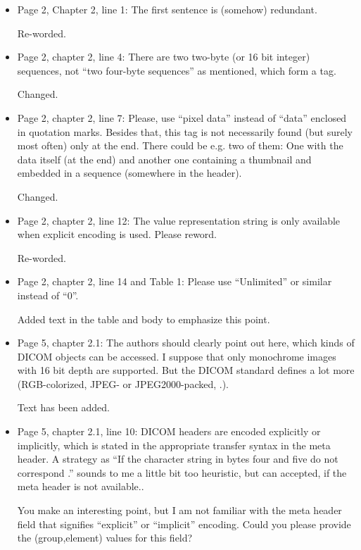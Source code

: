 \documentclass[11pt]{article}
\begin{document}
\begin{itemize}

\item Page 2, Chapter 2, line 1: The first sentence is (somehow)
  redundant.

  Re-worded.

\item Page 2, chapter 2, line 4: There are two two-byte (or 16 bit
  integer) sequences, not ``two four-byte sequences'' as mentioned,
  which form a tag.

  Changed.

\item Page 2, chapter 2, line 7: Please, use ``pixel data'' instead of
  ``data'' enclosed in quotation marks. Besides that, this tag is not
  necessarily found (but surely most often) only at the end. There
  could be e.g. two of them: One with the data itself (at the end) and
  another one containing a thumbnail and embedded in a sequence
  (somewhere in the header).

  Changed.

\item Page 2, chapter 2, line 12: The value representation string is
  only available when explicit encoding is used. Please reword.

  Re-worded.

\item Page 2, chapter 2, line 14 and Table 1: Please use ``Unlimited''
  or similar instead of ``0''.

  Added text in the table and body to emphasize this point.

\item Page 5, chapter 2.1: The authors should clearly point out here,
  which kinds of DICOM objects can be accessed. I suppose that only
  monochrome images with 16 bit depth are supported. But the DICOM
  standard defines a lot more (RGB-colorized, JPEG- or
  JPEG2000-packed, .).

  Text has been added.

\item Page 5, chapter 2.1, line 10: DICOM headers are encoded
  explicitly or implicitly, which is stated in the appropriate
  transfer syntax in the meta header.  A strategy as ``If the
  character string in bytes four and five do not correspond .'' sounds
  to me a little bit too heuristic, but can accepted, if the meta
  header is not available..

  You make an interesting point, but I am not familiar with the meta
  header field that signifies ``explicit'' or ``implicit'' encoding.
  Could you please provide the (group,element) values for this field?


\end{itemize}
\end{document}
